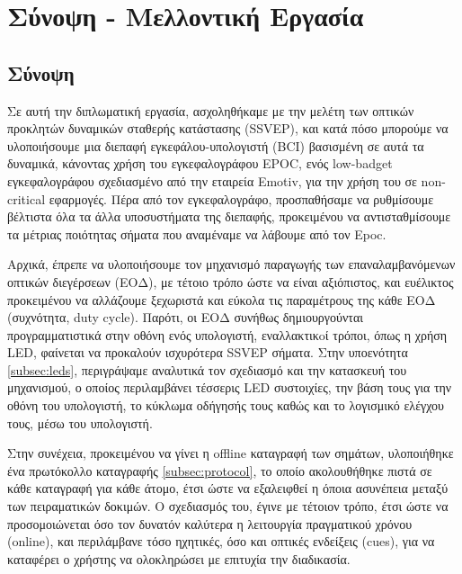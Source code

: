 \documentclass[11pt,a4paper,english,greek,twoside]{../Thesis}
\begin{document}
\chapter{Σύνοψη - Μελλοντική Εργασία} \label{chap:last}

\section{Σύνοψη}

\par Σε αυτή την διπλωματική εργασία, ασχοληθήκαμε με την μελέτη των οπτικών προκλητών δυναμικών σταθερής κατάστασης (SSVEP), και κατά πόσο μπορούμε να υλοποιήσουμε μια διεπαφή εγκεφάλου-υπολογιστή (BCI) βασισμένη σε αυτά τα δυναμικά, κάνοντας χρήση του εγκεφαλογράφου EPOC, ενός low-badget εγκεφαλογράφου σχεδιασμένο από την εταιρεία Emotiv, για την χρήση του σε non-critical εφαρμογές. Πέρα από τον εγκεφαλογράφο, προσπαθήσαμε να ρυθμίσουμε βέλτιστα όλα τα άλλα υποσυστήματα της διεπαφής, προκειμένου να αντισταθμίσουμε τα μέτριας ποιότητας σήματα που αναμέναμε να λάβουμε από τον Epoc.

\par Αρχικά, έπρεπε να υλοποιήσουμε τον μηχανισμό παραγωγής των επαναλαμβανόμενων οπτικών διεγέρσεων (ΕΟΔ), με τέτοιο τρόπο ώστε να είναι αξιόπιστος, και ευέλικτος προκειμένου να αλλάζουμε ξεχωριστά και εύκολα τις παραμέτρους της κάθε ΕΟΔ (συχνότητα, duty cycle). Παρότι, οι ΕΟΔ συνήθως δημιουργούνται προγραμματιστικά στην οθόνη ενός υπολογιστή, εναλλακτικoί τρόποι, όπως η χρήση LED, φαίνεται να προκαλούν ισχυρότερα SSVEP σήματα. Στην υποενότητα \ref{subsec:leds}, περιγράψαμε αναλυτικά τον σχεδιασμό και την κατασκευή του μηχανισμού, ο οποίος περιλαμβάνει τέσσερις LED συστοιχίες, την βάση τους για την οθόνη του υπολογιστή, το κύκλωμα οδήγησής τους καθώς και το λογισμικό ελέγχου τους, μέσω του υπολογιστή. 

\par Στην συνέχεια, προκειμένου να γίνει η offline καταγραφή των σημάτων, υλοποιήθηκε ένα πρωτόκολλο καταγραφής \ref{subsec:protocol}, το οποίο ακολουθήθηκε πιστά σε κάθε καταγραφή για κάθε άτομο, έτσι ώστε να εξαλειφθεί η όποια ασυνέπεια μεταξύ των πειραματικών δοκιμών. Ο σχεδιασμός του, έγινε με τέτοιον τρόπο, έτσι ώστε να προσομοιώνεται όσο τον δυνατόν καλύτερα η λειτουργία πραγματικού χρόνου (online), και περιλάμβανε τόσο ηχητικές, όσο και οπτικές ενδείξεις (cues), για να καταφέρει ο χρήστης να ολοκληρώσει με επιτυχία την διαδικασία.
\end{document}
